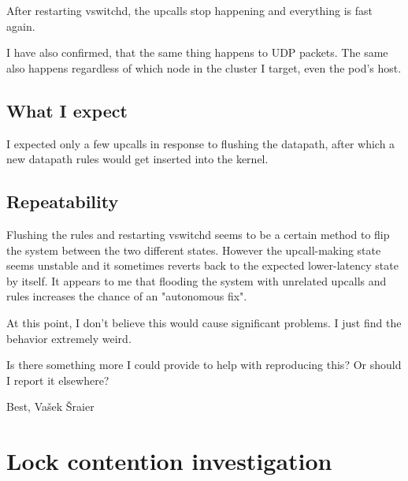 After restarting vswitchd, the upcalls stop happening and everything is fast again.


I have also confirmed, that the same thing happens to UDP packets. The same also happens regardless of which node in the cluster I target, even the pod's host.


\subsection{What I expect}


I expected only a few upcalls in response to flushing the datapath, after which a new datapath rules would get inserted into the kernel.


\subsection{Repeatability}


Flushing the rules and restarting vswitchd seems to be a certain method to flip the system between the two different states. However the upcall-making state seems unstable and it sometimes reverts back to the expected lower-latency state by itself. It appears to me that flooding the system with unrelated upcalls and rules increases the chance of an "autonomous fix".


At this point, I don't believe this would cause significant problems. I just find the behavior extremely weird.

Is there something more I could provide to help with reproducing this? Or should I report it elsewhere?


Best,
Vašek Šraier 

\section{Lock contention investigation}


